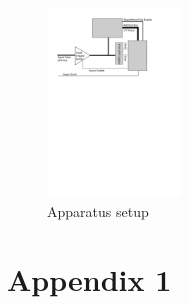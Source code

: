 \documentclass[11pt]{article}
\begin{document}
    \begin{figure}
    \centering
    \includegraphics[height=5cm]{block_diagram.svg}
    \caption{Apparatus setup}
    \label{fig:app}
    \end{figure}
	
\appendix
\appendixpage
\addappheadtotoc
\section{Appendix 1}
			
\end{document}
